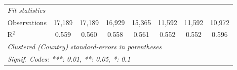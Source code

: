 \begin{tabular}{lccccccc}
   \midrule \emph{Fit statistics}\\
   Observations                                                      & 17,189        & 17,189        & 16,929        & 15,365        & 11,592       & 11,592       & 10,972\\  
   R$^2$                                                             & 0.559         & 0.560         & 0.558         & 0.561         & 0.552        & 0.552        & 0.596\\  
   \midrule
   \multicolumn{8}{l}{\emph{Clustered (Country) standard-errors in parentheses}}\\
   \multicolumn{8}{l}{\emph{Signif. Codes: ***: 0.01, **: 0.05, *: 0.1}}\\
\end{tabular}
\par\endgroup


